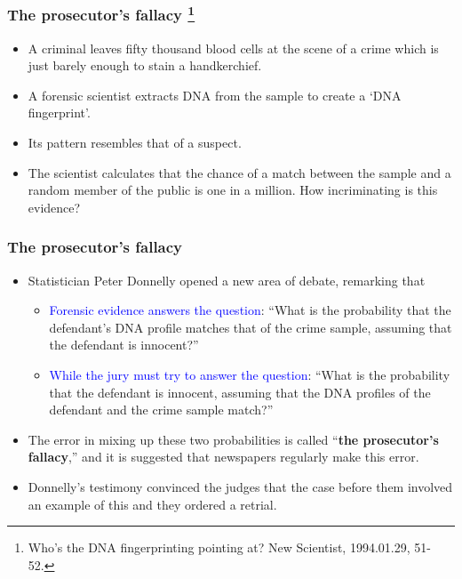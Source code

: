 \documentclass{beamer}\usepackage[]{graphicx}\usepackage[]{color}
\newcommand{\blue}[1]{\textcolor{blue}{#1}}
\begin{document}
\begin{frame}
\frametitle{The prosecutor's fallacy \footnote{{\tiny Who's the DNA fingerprinting pointing at? New Scientist, 1994.01.29, 51-52.}}}

 \begin{itemize}
 	\setlength\itemsep{1em}
 	\item A criminal leaves fifty thousand blood cells at the scene of a crime which is just barely enough to stain a handkerchief. 
 	\item A forensic scientist extracts DNA from the sample to create a ‘DNA fingerprint’. 
 	\item Its pattern resembles that of a suspect. 
 	\item The scientist calculates that the chance of a match between the sample and a random member of the public is one in a million. How incriminating is this evidence?
 \end{itemize}

\end{frame}

\begin{frame}
\frametitle{The prosecutor's fallacy}

	
	\begin{itemize}
		\item Statistician Peter Donnelly opened a new area of debate, remarking that 

\begin{itemize}
	 	\setlength\itemsep{1em}
	\item \blue{Forensic evidence answers the question}: ``What is the probability that the defendant's DNA profile matches that of the crime sample, assuming that the defendant is innocent?''
			
	\item \blue{While the jury must try to answer the question}: ``What is the probability that the defendant is 		innocent, assuming that the DNA profiles of the defendant and the crime sample match?'' 
\end{itemize}
\pause 
		\item
		The error in mixing up these two probabilities 
		is called ``\textbf{the prosecutor's fallacy},'' 
		and it is suggested that newspapers regularly 
		make this error. 
		\item
		Donnelly's testimony convinced the judges 
		that the case before them involved an example of this and they 
		ordered a retrial.
	\end{itemize}

\end{frame}
\end{document}
